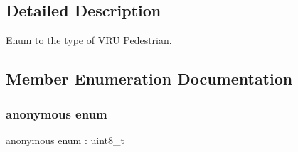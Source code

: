 \subsection{Detailed Description}
Enum to the type of V\+RU Pedestrian. 

\subsection{Member Enumeration Documentation}
\mbox{\label{structmaf__perception__interface_1_1VRUPedSubTypeEnum_a411ad32a46fd4f605d199de4d383c500}} 
\subsubsection{\texorpdfstring{anonymous enum}{anonymous enum}}
{\footnotesize\ttfamily anonymous enum \+: uint8\+\_\+t}

